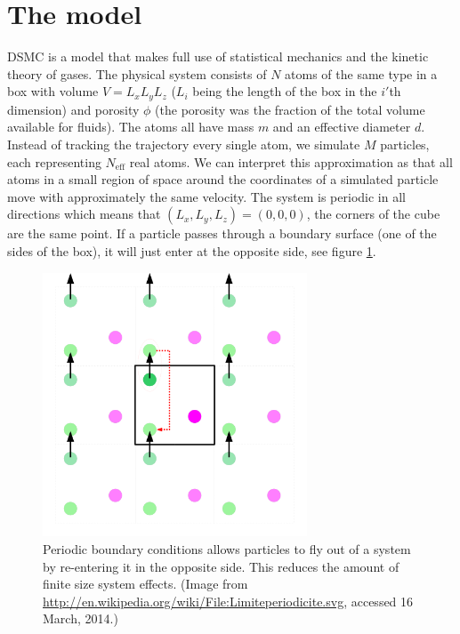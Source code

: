 \section{The model}
\label{sec:dsmc_model}
DSMC is a model that makes full use of statistical mechanics and the kinetic theory of gases. The physical system consists of $N$ atoms of the same type in a box with volume $V = L_xL_yL_z$ ($L_i$ being the length of the box in the $i'$th dimension) and porosity $\phi$ (the porosity was the fraction of the total volume available for fluids). The atoms all have mass $m$ and an effective diameter $d$. Instead of tracking the trajectory every single atom, we simulate $M$ particles, each representing $N_\text{eff}$ real atoms. We can interpret this approximation as that all atoms in a small region of space around the coordinates of a simulated particle move with approximately the same velocity. The system is periodic in all directions which means that $(L_x, L_y, L_z) = (0,0,0)$, the corners of the cube are the same point. If a particle passes through a boundary surface (one of the sides of the box), it will just enter at the opposite side, see figure \ref{fig:dsmc_periodic_boundary_conditions}.
\begin{figure}[ht]
\begin{center}
\includegraphics[width=0.7\textwidth, trim=0cm 0cm 0cm 0cm]{DSMC/figures/periodic_boundary_conditions.png}
\end{center}
\caption{Periodic boundary conditions allows particles to fly out of a system by re-entering it in the opposite side. This reduces the amount of finite size system effects. (Image from \url{http://en.wikipedia.org/wiki/File:Limiteperiodicite.svg}, accessed 16 March, 2014.)}
\label{fig:dsmc_periodic_boundary_conditions}
\end{figure}
